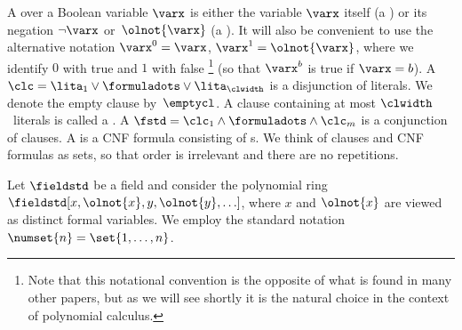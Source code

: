 \documentclass{toc}
\begin{document}
A  over a Boolean variable $\varx$ is either
the variable 
$\varx$ itself (a 
)
or its negation $\lnot \varx$ or~$\olnot{\varx}$ (a
). It will also be convenient to use
the alternative notation $\varx^0=\varx$, $\varx^1=\olnot{\varx}$,
where we identify $0$ with true and $1$ with false%
\footnote{Note that 
this notational convention is 
the opposite of what is found in many other papers, but as we will see
shortly it is the natural choice in the  context of polynomial
calculus.} 
(so that $\varx^b$ is true if $\varx = b$).
%
A  $\clc = \lita_1 \lor \formuladots \lor
\lita_{\clwidth}$ is a disjunction of literals. We denote the empty
clause by~$\emptycl$.  A clause containing at most $\clwidth$~literals
is called a . A
 $\fstd = \clc_1 \land \formuladots \land
\clc_m$ is a conjunction of clauses. A \introduceterm{\kcnfform{}} is
a CNF formula consisting of \xclause{\clwidth}{}s.
We think of clauses and CNF formulas as sets, %
so that order is irrelevant  and there %
are   %
no repetitions.

Let $\fieldstd$ be a 
%
field and consider the polynomial ring
$\fieldstd[x, \olnot{x}, y, \olnot{y}, \ldots]$,
%
where 
$x$
and
$\olnot{x}$
are viewed
as distinct formal 
variables. 
%
We employ the standard notation $\numset{n} =
\set{1,\ldots,n}$.
\end{document}

